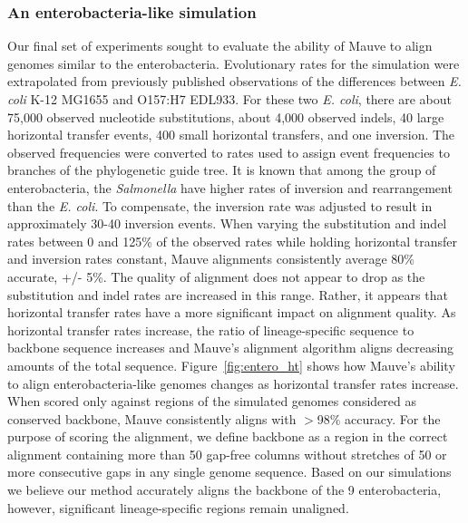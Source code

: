 \documentclass[titlepage,11pt]{article}
\begin{document}
\subsubsection*{An enterobacteria-like simulation}
Our final set of experiments sought to evaluate the ability of Mauve to align
genomes similar to the enterobacteria.  Evolutionary rates for the simulation
were extrapolated from previously published observations of the differences
between \textit{E. coli}
K-12 MG1655 and O157:H7 EDL933.  For these two \textit{E. coli}, there are about 75,000
observed nucleotide substitutions, about 4,000 observed indels,  40 large
horizontal transfer events, 400 small horizontal transfers, and one inversion.
The observed frequencies were converted to rates used to assign event
frequencies to branches of the phylogenetic guide tree.  It is known that among
the group of enterobacteria, the \textit{Salmonella} have higher rates of
inversion and rearrangement than the \textit{E. coli}.  To compensate, the
inversion rate was adjusted to result in approximately 30-40 inversion events.
When varying the substitution and indel rates between 0 and 125\% of the
observed rates while holding horizontal transfer and inversion rates constant,
Mauve alignments consistently average 80\% accurate, +/- 5\%.  The quality of
alignment does not appear to drop as the substitution and indel rates are
increased in this range.  Rather, it appears that horizontal transfer rates
have a more significant impact on alignment quality.  As horizontal transfer
rates increase, the ratio of lineage-specific sequence to backbone sequence
increases and Mauve's alignment algorithm aligns decreasing amounts of
the total sequence.  Figure~\ref{fig:entero_ht} shows how Mauve's ability to
align enterobacteria-like genomes changes as horizontal transfer rates
increase. When scored only against regions of the simulated genomes considered
as conserved backbone, Mauve consistently aligns with $>$98\% accuracy. For the
purpose of scoring the alignment, we define backbone as a region in the correct
alignment containing more than 50 gap-free columns without stretches of 50 or
more consecutive gaps in any single genome sequence. Based on our simulations
we believe our method accurately aligns the backbone of the 9 enterobacteria,
however, significant lineage-specific regions remain unaligned.

\end{document}
